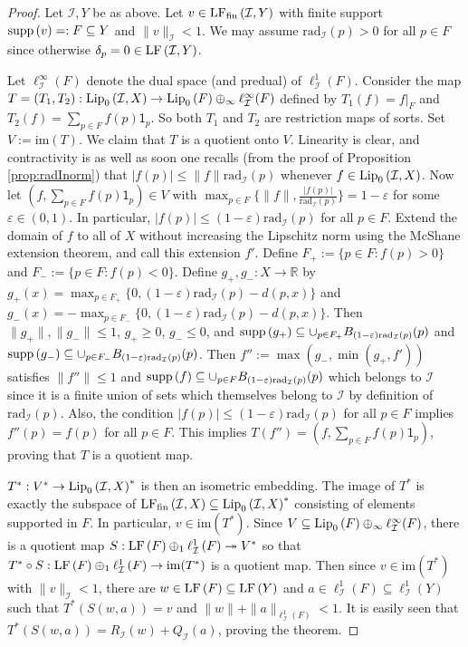 \documentclass[12pt]{amsart}
\theoremstyle{definition}
\numberwithin{equation}{section}
\def \R {\mathbb{R}}
\def \I {\mathcal{I}}
\def \comp {\circ}
\def \sbs {\subseteq}
\def \eps {\varepsilon}
\def \im {\mathrm{im}}
\def \one {\mathsf{1}}
\renewcommand{\l}[2]{\ell^1_{#1}\left( #2 \right)}
\newcommand{\rad}[2]{\mathrm{rad}_{#1}\left(#2\right)}
\begin{document}
\begin{proof}
Let $\I,Y$ be as above. Let $v \in \LFf{\I}{Y}$ with finite support $\supp{v} =: F \sbs Y$ and $\|v\|_\I < 1$. We may assume $\rad{\I}{p} > 0$ for all $p \in F$ since otherwise $\delta_p = 0 \in \LF{\I}{Y}$.

Let $\ell^\infty_\I(F)$ denote the dual space (and predual) of $\l{\I}{F}$. Consider the map $T = (T_1,T_2): \Lip{\I}{X} \to \Lip{F} \oplus_\infty \ell^\infty_\I(F)$ defined by $T_1(f) = f \big|_F$ and $T_2(f) = \sum_{p \in F} f(p)\one_p$. So both $T_1$ and $T_2$ are restriction maps of sorts. Set $V := \im(T)$. We claim that $T$ is a quotient onto $V$. Linearity is clear, and contractivity is as well as soon one recalls (from the proof of Proposition \ref{prop:radInorm}) that $|f(p)| \leq \|f\|\rad{\I}{p}$ whenever $f \in \Lip{\I}{X}$. Now let $(f,\sum_{p \in F} f(p)\one_p) \in V$ with $\max_{p \in F} \{\|f\|,\frac{|f(p)|}{\rad{\I}{p}}\} = 1-\eps$ for some $\eps \in (0,1)$. In particular, $|f(p)| \leq (1-\eps)\rad{\I}{p}$ for all $p \in F$. Extend the domain of $f$ to all of $X$ without increasing the Lipschitz norm using the McShane extension theorem, and call this extension $f'$. Define $F_+ := \{p \in F: f(p) > 0\}$ and $F_- := \{p \in F: f(p) < 0\}$. Define $g_+,g_-: X \to \R$ by $g_+(x) = \max_{p \in F_+} \{0,(1-\eps)\rad{\I}{p}-d(p,x)\}$ and $g_-(x) = -\max_{p \in F_-} \{0,(1-\eps)\rad{\I}{p}-d(p,x)\}$. Then $\|g_+\|,\|g_-\| \leq 1$, $g_+ \geq 0$, $g_- \leq 0$, and $\supp{g_+} \sbs \cup_{p \in F_+} B_{(1-\eps)\rad{\I}{p}}(p)$  and $\supp{g_-} \sbs \cup_{p \in F_-} B_{(1-\eps)\rad{\I}{p}}(p)$. Then $f'' := \max(g_-,\min(g_+,f'))$ satisfies $\|f''\| \leq 1$ and $\supp{f} \sbs \cup_{p \in F} B_{(1-\eps)\rad{\I}{p}}(p)$ which belongs to $\I$ since it is a finite union of sets which themselves belong to $\I$ by definition of $\rad{\I}{p}$. Also, the condition $|f(p)| \leq (1-\eps)\rad{\I}{p}$ for all $p \in F$ implies $f''(p) = f(p)$ for all $p \in F$. This implies $T(f'') = (f,\sum_{p \in F} f(p)\one_p)$, proving that $T$ is a quotient map.

$T^*: V^* \to \Lip{\I}{X}^*$ is then an isometric embedding. The image of $T^*$ is exactly the subspace of $\LFf{\I}{X} \sbs \Lip{\I}{X}^*$ consisting of elements supported in $F$. In particular, $v \in \im(T^*)$. Since $V \sbs \Lip{F} \oplus_\infty \ell^\infty_\I(F)$, there is a quotient map $S: \LF{F} \oplus_1 \l{\I}{F} \twoheadrightarrow V^*$ so that $T^* \comp S: \LF{F} \oplus_1 \l{\I}{F} \to \im(T^*)$ is a quotient map. Then since $v \in \im(T^*)$ with $\|v\|_\I < 1$, there are $w \in \LF{F} \sbs \LF{Y}$ and $a \in \l{\I}{F} \sbs \l{\I}{Y}$ such that $T^*(S(w,a)) = v$ and $\|w\| + \|a\|_{\l{\I}{F}} < 1$. It is easily seen that $T^*(S(w,a)) = R_{\I}(w) + Q_{\I}(a)$, proving the theorem.
\end{proof}
\end{document}
